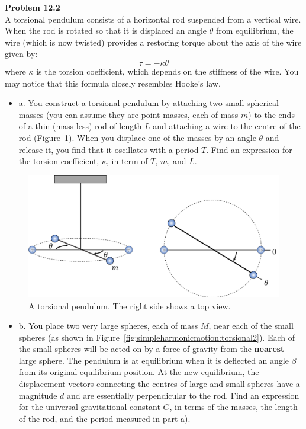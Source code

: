 \begin{framed}
\textbf{Problem 12.2}\\
A torsional pendulum consists of a horizontal rod suspended from a vertical wire. When the rod is rotated so that it is displaced an angle $\theta$ from equilibrium, the wire (which is now twisted) provides a restoring torque about the axis of the wire given by:
\begin{equation}
\tau=-\kappa\theta
\end{equation}
where $\kappa$ is the torsion coefficient, which depends on the stiffness of the wire. You may notice that this formula closely resembles Hooke's law.

\begin{itemize}
\item a.  You construct a torsional pendulum by attaching two small spherical masses (you can assume they are point masses, each of mass $m$) to the ends of a thin (mass-less) rod of length $L$ and attaching a wire to the centre of the rod (Figure~\ref{fig:simpleharmonicmotion:torsional1}). When you displace one of the masses by an angle $\theta$ and release it, you find that it oscillates with a period $T$. Find an expression for the torsion coefficient, $\kappa$, in term of $T$, $m$, and $L$.
\end{itemize}

\begin{figure}[!htbp]
\centering
\includegraphics[width=0.8\linewidth]{files/torsionalpendulum1-1a91cb49135990459b6e33c6b4b493fc.png}
\caption[]{A torsional pendulum. The right side shows a top view.}
\label{fig:simpleharmonicmotion:torsional1}
\end{figure}

\begin{itemize}
\item b. You place two very large spheres, each of mass $M$, near each of the small spheres (as shown in Figure~\ref{fig:simpleharmonicmotion:torsional2}). Each of the small spheres will be acted on by a force of gravity from the \textbf{nearest} large sphere. The pendulum is at equilibrium when it is deflected an angle $\beta$ from its original equilibrium position. At the new equilibrium, the displacement vectors connecting the centres of large and small spheres have a magnitude $d$ and are essentially perpendicular to the rod. Find an expression for the universal gravitational constant $G$, in terms of the masses, the length of the rod, and the period measured in part a).
\end{itemize}


\end{framed}
